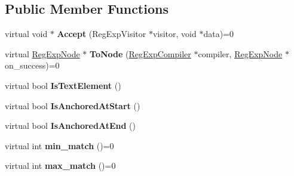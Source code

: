 \subsection*{Public Member Functions}
\begin{DoxyCompactItemize}
\item 
\hypertarget{classv8_1_1internal_1_1_reg_exp_tree_a47b10904011eb76bb081c2354c5d0232}{}virtual void $\ast$ {\bfseries Accept} (Reg\+Exp\+Visitor $\ast$visitor, void $\ast$data)=0\label{classv8_1_1internal_1_1_reg_exp_tree_a47b10904011eb76bb081c2354c5d0232}

\item 
\hypertarget{classv8_1_1internal_1_1_reg_exp_tree_a9670a35c2a033db8032ca275910e1ac2}{}virtual \hyperlink{classv8_1_1internal_1_1_reg_exp_node}{Reg\+Exp\+Node} $\ast$ {\bfseries To\+Node} (\hyperlink{classv8_1_1internal_1_1_reg_exp_compiler}{Reg\+Exp\+Compiler} $\ast$compiler, \hyperlink{classv8_1_1internal_1_1_reg_exp_node}{Reg\+Exp\+Node} $\ast$on\+\_\+success)=0\label{classv8_1_1internal_1_1_reg_exp_tree_a9670a35c2a033db8032ca275910e1ac2}

\item 
\hypertarget{classv8_1_1internal_1_1_reg_exp_tree_ad942297d0d8695a8401e3841d9ad5b8c}{}virtual bool {\bfseries Is\+Text\+Element} ()\label{classv8_1_1internal_1_1_reg_exp_tree_ad942297d0d8695a8401e3841d9ad5b8c}

\item 
\hypertarget{classv8_1_1internal_1_1_reg_exp_tree_a63684350c648009df5ee42068a39a4fc}{}virtual bool {\bfseries Is\+Anchored\+At\+Start} ()\label{classv8_1_1internal_1_1_reg_exp_tree_a63684350c648009df5ee42068a39a4fc}

\item 
\hypertarget{classv8_1_1internal_1_1_reg_exp_tree_a6a53cc0f2787e7cd698f5c44886f9816}{}virtual bool {\bfseries Is\+Anchored\+At\+End} ()\label{classv8_1_1internal_1_1_reg_exp_tree_a6a53cc0f2787e7cd698f5c44886f9816}

\item 
\hypertarget{classv8_1_1internal_1_1_reg_exp_tree_a6aee84bbe2e078446f84681b70ebc32a}{}virtual int {\bfseries min\+\_\+match} ()=0\label{classv8_1_1internal_1_1_reg_exp_tree_a6aee84bbe2e078446f84681b70ebc32a}

\item 
\hypertarget{classv8_1_1internal_1_1_reg_exp_tree_ad27450dae179517a30b47de7eedde3c4}{}virtual int {\bfseries max\+\_\+match} ()=0\label{classv8_1_1internal_1_1_reg_exp_tree_ad27450dae179517a30b47de7eedde3c4}


\end{DoxyCompactItemize}
